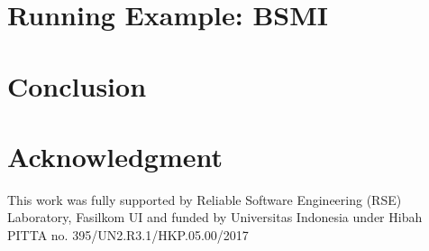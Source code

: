 \documentclass[conference]{IEEEtran}
\begin{document}
\section{Running Example: BSMI}

\section{Conclusion}


\section*{Acknowledgment}
This work was fully supported by Reliable Software Engineering (RSE) Laboratory, Fasilkom UI and funded by Universitas Indonesia under Hibah PITTA no. 395/UN2.R3.1/HKP.05.00/2017




\end{document}
